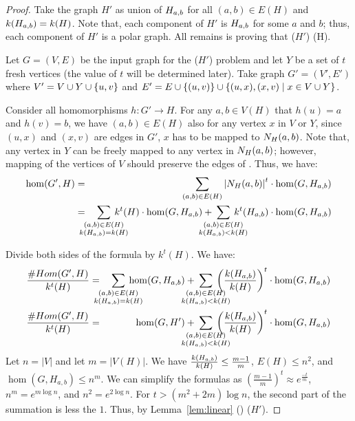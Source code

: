\begin{proof}
Take the graph \(H'\) as union of \(H_{a,b}\) for all \((a,b)\in E(H)\) and
\(k(H_{a,b})=k(H)\)\@. Note that, each component of \(H'\) is \(H_{a,b}\) for 
some \(a\) and \(b\); thus, each component of \(H'\) is a polar graph.
All remains is proving that \chom(\(H'\)) \maple \chom(H)\@.

Let \(G=(V,E)\) be the input graph for the \chom(\(H'\)) problem 
and let \(Y\) be a set of \(t\) fresh vertices
(the value of \(t\) will be determined later). Take graph \(G'=(V',E')\) where
\(V'=V \cup Y \cup \{{u,v}\}\) and \(E'=E \cup \{{(u,v)}\} \cup
\{{(u,x),(x,v) \mid x\in V \cup Y}\}\)\@.

Consider all homomorphisms \(h: G'\to H\)\@.
For any \(a,b\in V(H)\) that \(h(u)=a\) and \(h(v)=b\), we have \((a,b)\in E(H)\) also
for any vertex \(x\) in \(V\) or \(Y\), since \((u,x)\) and \((x,v)\) are edges in \(G'\), 
\(x\) has to be mapped to \(N_{H}({a},{b})\)\@. Note that, any vertex in \(Y\) can be freely mapped
to any vertex in \(N_{H}({a},{b})\); however, mapping of the vertices of \(V\) should preserve the edges 
of \mG\@. Thus, we have:
\begin{eqnarray*}
\hom(G',H) &=&  
\sum_{(a,b)\in E(H)}\left|\NHab Hab\right|^ t \cdot
\hom(G,\Hab)\\
&=& 
\bigsum{\substack{(a,b)\in E(H) \\
\magf(H_{a,b})=\magf(H)}} 
\magf^t(H) \cdot \hom(G,H_{a,b})+
\bigsum{\substack{(a,b)\in E(H) \\ \magf(H_{a,b}) < \magf(H)}}k^t
(H_{a,b})\cdot \hom(G,H_{a,b})
\end{eqnarray*}

Divide both sides of the formula by \(k^t(H)\)\@. We have:
\begin{eqnarray*}
\frac{\chom(G',H)}{\magf^t(H)} &=& 
\bigsum{\substack{(a,b)\in E(H) \\ \magf(H_{a,b})=\magf(H)}} 
\hom(G,H_{a,b}) + 
\bigsum{\substack{(a,b)\in E(H) \\ \magf(H_{a,b})<\magf(H)}}
\left(\frac{\magf(H_{a,b})}{\magf(H)} \right )^t
\cdot\hom(G,H_{a,b})\\
\frac{\chom(G',H)}{\magf^t(H)} &=& 
\hom(G,H') + \bigsum{\substack{(a,b)\in E(H) \\ \magf(H_{a,b})<\magf(H)}}
\left(\frac{\magf(H_{a,b})}{\magf(H)} \right )^t
\cdot\hom(G,H_{a,b})\\
\end{eqnarray*}
Let \(n=|V|\) and let \(m=|V(H)|\). We have \(\frac{k(H_{a,b})}{k(H)} \le \frac{m-1}{m}\),
\(E(H)\le n^2\), and \(\hom(G,H_{a,b}) \le n^m\).
We can simplify the formulas as \((\frac{m-1}{m})^t \approx e^{\frac{-t}{m}}\),
\(n^m = e^{m\log n}\), and \(n^2 = e^{2\log n}\).
For \(t > (m^2+2m) \log n\), the second part of the summation is less the \(1\).
Thus, by Lemma~\ref{lem:linear} \chom(\mH) \mapge \chom(\(H'\)).
\end{proof}

